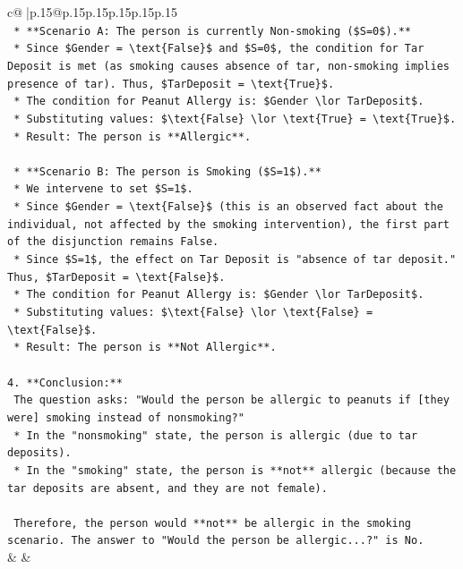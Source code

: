 \documentclass{article}
\begin{document}
{\begin{supertabular}{c@{$\;$}|p{.15\linewidth}@{}p{.15\linewidth}p{.15\linewidth}p{.15\linewidth}p{.15\linewidth}p{.15\linewidth}}
{{{\\ 
\texttt{    *   **Scenario A: The person is currently Non{-}smoking (\$S=0\$).**} \\
\texttt{        *   Since \$Gender = \textbackslash{}text\{False\}\$ and \$S=0\$, the condition for Tar Deposit is met (as smoking causes absence of tar, non{-}smoking implies presence of tar). Thus, \$TarDeposit = \textbackslash{}text\{True\}\$.} \\
\texttt{        *   The condition for Peanut Allergy is: \$Gender \textbackslash{}lor TarDeposit\$.} \\
\texttt{        *   Substituting values: \$\textbackslash{}text\{False\} \textbackslash{}lor \textbackslash{}text\{True\} = \textbackslash{}text\{True\}\$.} \\
\texttt{        *   Result: The person is **Allergic**.} \\
\\ 
\texttt{    *   **Scenario B: The person is Smoking (\$S=1\$).**} \\
\texttt{        *   We intervene to set \$S=1\$.} \\
\texttt{        *   Since \$Gender = \textbackslash{}text\{False\}\$ (this is an observed fact about the individual, not affected by the smoking intervention), the first part of the disjunction remains False.} \\
\texttt{        *   Since \$S=1\$, the effect on Tar Deposit is "absence of tar deposit." Thus, \$TarDeposit = \textbackslash{}text\{False\}\$.} \\
\texttt{        *   The condition for Peanut Allergy is: \$Gender \textbackslash{}lor TarDeposit\$.} \\
\texttt{        *   Substituting values: \$\textbackslash{}text\{False\} \textbackslash{}lor \textbackslash{}text\{False\} = \textbackslash{}text\{False\}\$.} \\
\texttt{        *   Result: The person is **Not Allergic**.} \\
\\ 
\texttt{4.  **Conclusion:**} \\
\texttt{    The question asks: "Would the person be allergic to peanuts if {[}they were{]} smoking instead of nonsmoking?"} \\
\texttt{    *   In the "nonsmoking" state, the person is allergic (due to tar deposits).} \\
\texttt{    *   In the "smoking" state, the person is **not** allergic (because the tar deposits are absent, and they are not female).} \\
\\ 
\texttt{    Therefore, the person would **not** be allergic in the smoking scenario. The answer to "Would the person be allergic...?" is No.} \\
            }
        }
    }
    & & \\ \\


\end{supertabular}}
\end{document}
